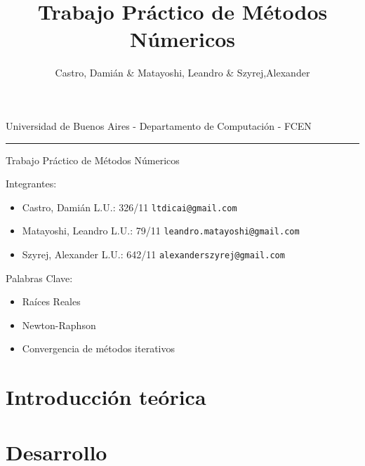 \documentclass[a4paper,11pt]{article}
\title{Trabajo Práctico de Métodos Númericos}
\author{Castro, Dami\'an \& Matayoshi, Leandro \& Szyrej,Alexander}
\begin{document}
\begin{center}
	Universidad de Buenos Aires - Departamento de Computaci\'on - FCEN
\end{center}

\rule{\linewidth}{0.5mm}

\vspace{1cm}

\begin{center}
	\Huge{Trabajo Práctico de Métodos Númericos}
\end{center}


\vspace{4cm}


Integrantes:
\begin{itemize}
	\item Castro, Dami\'an L.U.: 326/11  \verb+ltdicai@gmail.com+
	\item Matayoshi, Leandro L.U.: 79/11 \verb+leandro.matayoshi@gmail.com+
	\item Szyrej, Alexander L.U.: 642/11   \verb+alexanderszyrej@gmail.com+
	
\end{itemize}



\vspace{4cm}

Palabras Clave:
\begin{itemize}
	\item Ra\'ices Reales
	\item Newton-Raphson
	\item Convergencia de m\'etodos iterativos
\end{itemize}


\newpage

\tableofcontents

\newpage

\section{Introducción teórica}



\section{Desarrollo}


\end{document}

